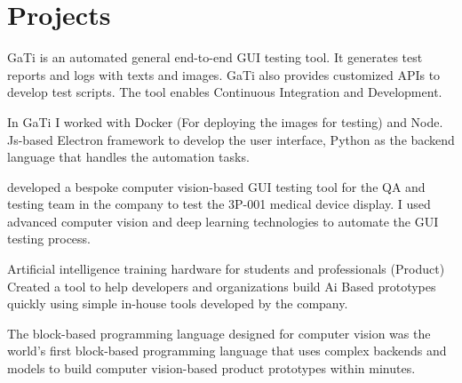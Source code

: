 \documentclass[]{plushcv}
\begin{document}
\begin{minipage}[t]{0.70\textwidth}

\section{Projects}
\begin{tightemize}
\item GaTi is an automated general end-to-end GUI testing tool. It generates test reports and logs with texts and images. GaTi also provides customized APIs to develop test scripts. The tool enables Continuous Integration and Development. 
\item In GaTi I worked with Docker (For deploying the images for testing) and Node. Js-based Electron framework to develop the user interface, Python as the backend language that handles the automation tasks.
\end{tightemize}
\sectionsep
{}
\begin{tightemize}
\item developed a bespoke computer vision-based GUI testing tool for the QA and testing team in the company to test the 3P-001 medical device display. I used advanced computer vision and deep learning technologies to automate the GUI testing process.
\end{tightemize}
\begin{tightemize}
\item Artificial intelligence training hardware for students and professionals (Product)
Created a tool to help developers and organizations build Ai Based prototypes quickly using simple in-house tools developed by the company. 
\item The block-based programming language designed for computer vision was the world's first block-based programming language that uses complex backends and models to build computer vision-based product prototypes within minutes.
\end{tightemize}
\sectionsep



\end{minipage}
\end{document}
